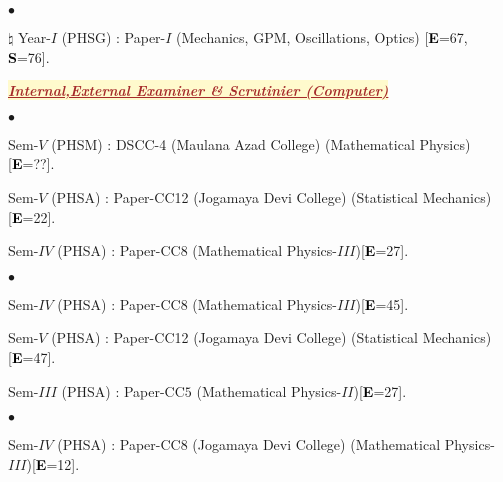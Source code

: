 \documentclass[margin,line]{res}
\newenvironment{list1}{
  \begin{list}{\ding{113}}{%
      \setlength{\itemsep}{0in}
      \setlength{\parsep}{0in} \setlength{\parskip}{0in}
      \setlength{\topsep}{0in} \setlength{\partopsep}{0in} 
      \setlength{\leftmargin}{0.17in}}}{\end{list}}
\newenvironment{list2}{
  \begin{list}{$\bullet$}{%
      \setlength{\itemsep}{0in}
      \setlength{\parsep}{0in} \setlength{\parskip}{0in}
      \setlength{\topsep}{0in} \setlength{\partopsep}{0in} 
      \setlength{\leftmargin}{0.2in}}}{\end{list}}
\begin{document}
\begin{resume}
\begin{list2}
\item[$\pmb{\natural}$] Year-$I$ (PHSG) : Paper-$I$ (Mechanics, GPM, Oscillations, Optics) [\textcolor{black}{\bf E}=67, \textcolor{black}{\bf S}=76].
\end{list2}
\vspace{2mm}
\begin{list1}
\item[] \colorbox{lemonchiffon}{\textcolor{brown}{\underline{\textbf{\textit{Internal,External Examiner \& Scrutinier (Computer)}}}}}
\vspace{1mm}
\end{list1}
\begin{list1}
\item[] \textcolor{iris}{}
\vspace{1mm}
\end{list1}
\begin{list2}
\item Sem-$V$ (PHSM) : DSCC-4 (Maulana Azad College) (Mathematical Physics)[\textcolor{black}{\bf E}=??]. 
\item Sem-$V$ (PHSA) : Paper-CC12 (Jogamaya Devi College) (Statistical Mechanics)[\textcolor{black}{\bf E}=22]. 
\item Sem-$IV$ (PHSA) : Paper-CC8 (Mathematical Physics-$III$)[\textcolor{black}{\bf E}=27]. 
\end{list2}
\begin{list1}
\item[] \textcolor{iris}{}
\vspace{1mm}
\end{list1}
\begin{list2}
\item Sem-$IV$ (PHSA) : Paper-CC8 (Mathematical Physics-$III$)[\textcolor{black}{\bf E}=45]. 
\item Sem-$V$ (PHSA) : Paper-CC12 (Jogamaya Devi College) (Statistical Mechanics)[\textcolor{black}{\bf E}=47]. 
\item Sem-$III$ (PHSA) : Paper-CC$5$ (Mathematical Physics-$II$)[\textcolor{black}{\bf E}=27].
\end{list2}
\begin{list1}
\item[] \textcolor{iris}{}
\vspace{1mm}
\end{list1}
\begin{list2}
\item Sem-$IV$ (PHSA) : Paper-CC8 (Jogamaya Devi College) (Mathematical Physics-$III$)[\textcolor{black}{\bf E}=12]. 

\end{list2}
\end{resume}
\end{document}
